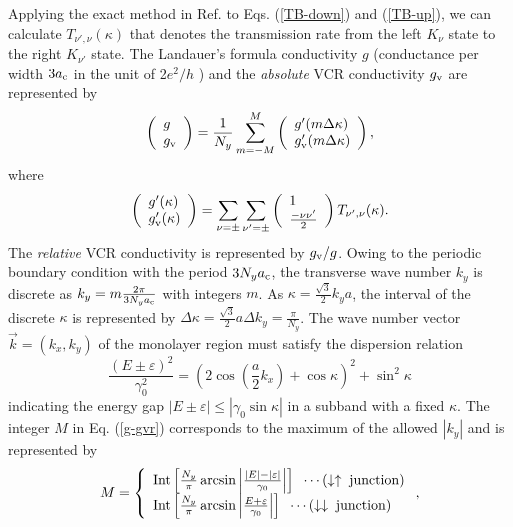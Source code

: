 \documentclass{jpsj3}
\begin{document}
Applying the exact method in Ref. \cite{tamura-2019} to Eqs. (\ref{TB-down}) and (\ref{TB-up}), we can calculate $T_{\nu',\nu}(\kappa)$ that denotes the transmission rate
from the left $K_\nu$ state to the right $K_{\nu'}$ state.
The Landauer's formula conductivity $g$ (conductance per width $3a_{\rm c}$
in the unit of 2$e^2/h$ ) 
and the {\it absolute} VCR conductivity $g_{\rm v}$ are represented by
\begin{equation}
\left(
\begin{array}{l}
g
\\
g_{\rm v}
\end{array}
\right)
=\frac{1}{N_y} 
\sum_{m=-M}^M 
\left(
\begin{array}{l}
g'(m \Delta \kappa )
\\
g_{\rm v}' (m \Delta \kappa )
\end{array}
\right),
\label{g-gvr}
\end{equation}
where 
\begin{equation}
\left(
\begin{array}{l}
g'(\kappa)
\\
g_{\rm v}'(\kappa)
\end{array}
\right)
=\sum_{\nu=\pm}\sum_{\nu'=\pm}
\left(
\begin{array}{l}
1
\\
\frac{-\nu\nu'}{2}
\end{array}
\right)
T_{\nu',\nu}(\kappa).
\end{equation}
The {\it relative} VCR conductivity is represented by $g_{\rm v}/g$.
Owing to the periodic boundary condition
with the period $3N_ya_{\rm c}$,
 the transverse wave number $k_y$ is discrete 
as $k_y=m\frac{2\pi}{3N_ya_{\rm c}}$ with integers $m$.
As $\kappa= \frac{\sqrt{3}}{2}k_ya$, 
the interval of the discrete $\kappa$ is represented by
$\Delta \kappa = \frac{\sqrt{3}}{2}a \Delta k_y = \frac{\pi}{N_y}$. 
The wave number vector $\vec{k}=(k_x,k_y)$ 
of the monolayer region
must satisfy 
the dispersion relation
\begin{equation}
\frac{(E\pm\varepsilon)^2}{\gamma_0^2}=\left(2\cos\left(\frac{a}{2}k_x\right)
+\cos\kappa\right)^2+\sin^2\kappa
\label{monolayer-gap}
\end{equation}
indicating the energy gap $|E \pm \varepsilon| \leq |\gamma_0 \sin \kappa|$ 
in a subband with a fixed $\kappa$.
 The integer $M$ in Eq. (\ref{g-gvr})
corresponds to the maximum of the allowed $|k_y|$
and is represented by
\begin{equation}
M=
\left\{
\begin{array}{l}
{\rm Int} \left[\frac{N_y}{\pi}\arcsin\left|\frac{|E|-|\varepsilon|}{\gamma_0} \right|\right]
\;\;\cdots(\downarrow\uparrow \;{\rm junction})
\\
{\rm Int} \left[\frac{N_y}{\pi}\arcsin\left|\frac{E+\varepsilon}{\gamma_0} \right|\right]
\;\;\cdots(\downarrow\downarrow \;{\rm junction})
\end{array}
\right.,
\label{M-condition}
\end{equation}
\end{document}
